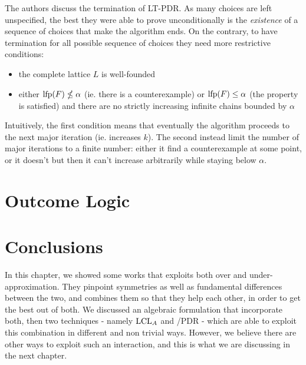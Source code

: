 The authors discuss the termination of LT-PDR. As many choices are left unspecified, the best they were able to prove unconditionally is the \emph{existence} of a sequence of choices that make the algorithm ends. On the contrary, to have termination for all possible sequence of choices they need more restrictive conditions:
\begin{itemize}
	\item the complete lattice $L$ is well-founded
	\item either $\text{lfp}(F) \nleq \alpha$ (ie. there is a counterexample) or $\text{lfp}(F) \le \alpha$ (the property is satisfied) and there are no strictly increasing infinite chains bounded by $\alpha$
\end{itemize}
Intuitively, the first condition means that eventually the algorithm proceeds to the next major iteration (ie. increases $k$). The second instead limit the number of major iterations to a finite number: either it find a counterexample at some point, or it doesn't but then it can't increase arbitrarily while staying below $\alpha$.

\section{Outcome Logic}\label{sec:sota:ol}

\section{Conclusions}
In this chapter, we showed some works that exploits both over and under-approximation. They pinpoint symmetries as well as fundamental differences between the two, and combines them so that they help each other, in order to get the best out of both. We discussed an algebraic formulation that incorporate both, then two techniques - namely $\text{LCL}_A$ and /PDR - which are able to exploit this combination in different and non trivial ways. However, we believe there are other ways to exploit such an interaction, and this is what we are discussing in the next chapter.